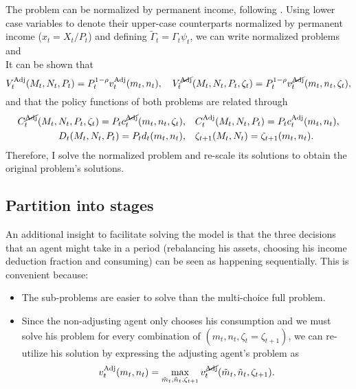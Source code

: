 \documentclass[./RiskyContrib.tex]{subfiles}
\begin{document}
The problem can be normalized by permanent income, following
\cite{Carroll2020solvingmicrodsops}. Using lower case variables to
denote their upper-case counterparts normalized by permanent income ($x_t = X_t/P_t$)
and defining $\tilde{\Gamma}_t = \Gamma_{t}\psi_{t}$, we can write
normalized problems
\begin{equation}\label{eq:bellman_NAdj_norm}

\end{equation}
and
\begin{equation*}

\end{equation*}
It can be shown that
\begin{equation*}
V_{t}^{\text{Adj}}(M_t,N_t,P_t) = P_t^{1-\rho} v_{t}^{\text{Adj}}(m_t,n_t), \quad
V_{t}^{\cancel{\text{Adj}}}(M_t,N_t,P_t,\zeta_t) = P_t^{1-\rho} v_{t}^{\cancel{\text{Adj}}}(m_t,n_t,\zeta_t),
\end{equation*}
and that the policy functions of both problems are related through
\begin{equation*}
\begin{split}
C_t^{\cancel{\text{Adj}}}(M_t,N_t,P_t,\zeta_t) = P_t c_t^{\cancel{\text{Adj}}}(m_t,n_t,\zeta_t),& \quad C_t^{\text{Adj}}(M_t,N_t,P_t) = P_t c_t^{\text{Adj}}(m_t,n_t),\\
D_t(M_t,N_t,P_t) = P_t d_t(m_t,n_t),& \quad \zeta_{t+1}(M_t,N_t) = \zeta_{t+1}(m_t,n_t).
\end{split}
\end{equation*}
Therefore, I solve the normalized problem and re-scale its solutions to obtain
the original problem's solutions.

\subsection{Partition into stages}

An additional insight to facilitate solving the model is that the three decisions
that an agent might take in a period (rebalancing his assets, choosing his income
deduction fraction and consuming) can be seen as happening sequentially. This is
convenient because:
\begin{itemize}
\item The sub-problems are easier to solve than the multi-choice full problem.
\item Since the non-adjusting agent only chooses his consumption and we must
solve his problem for every combination of $(m_t, n_t, \zeta_t=\zeta_{t+1})$, we can re-utilize
his solution by expressing the adjusting agent's  problem as
\begin{equation*}
v_t^{\text{Adj}}(m_t,n_t) = \max_{\tilde{m}_t, \tilde{n}_t, \zeta_{t+1}} v_t^{\cancel{\text{Adj}}}(\tilde{m}_t, \tilde{n}_t, \zeta_{t+1}).
\end{equation*}
\end{itemize}
\end{document}
